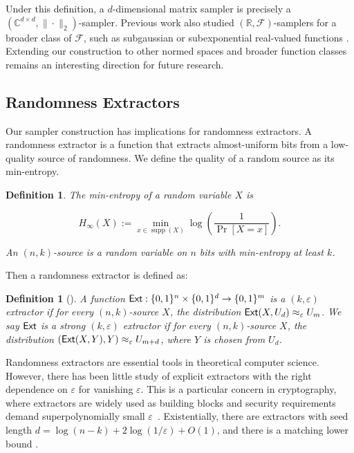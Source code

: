 \documentclass[10pt,a4paper]{article}
\newtheorem{definition}[theorem]{Definition}
\newcommand{\C}{\mathbb{C}}
\newcommand{\R}{\mathbb{R}}
\DeclareMathOperator*{\supp}{supp}
\newcommand{\eps}{\varepsilon}
\newcommand{\1}{\mathbbm{1}}
\newcommand{\Ext}{\textup{\textsf{Ext}}}
\begin{document}
Under this definition, a \(d\)-dimensional matrix sampler is precisely a \((\C^{d\times d},\|\cdot\|_2)\)-sampler. Previous work also studied $(\R, \mathcal{F})$-samplers for a broader class of $\mathcal{F}$, such as subgaussian or subexponential real-valued functions \cite{Bla19,Agr19}. Extending our construction to other normed spaces and broader function classes remains an interesting direction for future research.


 \subsection{Randomness Extractors}

 
Our sampler construction has implications for randomness extractors.
A randomness extractor is a function that extracts almost-uniform bits from a low-quality source of randomness. We define the quality of a random source as its min-entropy.
\begin{definition}
    The min-entropy of a random variable $X$ is 
    
    \[ H_{\infty}(X) := \min_{x \in \supp(X)} \log\left(\frac{1}{\Pr[X = x]}\right). \]


An $(n,k)$-source is a random variable on $n$ bits with min-entropy at least $k$.
\end{definition}

Then a randomness extractor is defined as:

\begin{definition}[\cite{Nisan_Zuckerman}]
A function $\Ext : \{0,1\}^n \times \{0,1\}^d \rightarrow \{0,1\}^m$ is a $(k,\varepsilon)$ extractor if for every $(n,k)$-source $X$, the distribution $\Ext(X,U_d) \approx_{\varepsilon} U_m$. We say $\Ext$ is a \emph{strong} $(k,\varepsilon)$ extractor if for every $(n,k)$-source $X$, the distribution $(\Ext(X,Y), Y) \approx_{\varepsilon} U_{m+d}$, where $Y$ is chosen from $U_d$.
\end{definition}
 
Randomness extractors are essential tools in theoretical computer science. However, there has been little study of explicit extractors with the right dependence on $\eps$ for vanishing $\eps$. 
This is a particular concern in cryptography, where extractors are widely used as building blocks and security requirements demand superpolynomially small $\eps$~\cite{Lu2002, Vadhan2003, Canetti2000, Dodis2002, Kalai2008, Kalai2009, Dodis2009}. 
Existentially, there are extractors with seed length $d = \log(n - k) + 2 \log(1 / \eps) + O(1)$, and there is a matching lower bound \cite{RT00}. 
\end{document}
